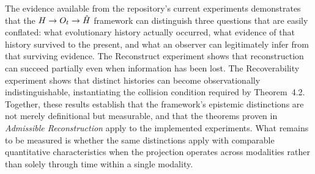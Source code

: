 The evidence available from the repository's current experiments demonstrates that the $H \to O_t \to \hat{H}$ framework can distinguish three questions that are easily conflated: what evolutionary history actually occurred, what evidence of that history survived to the present, and what an observer can legitimately infer from that surviving evidence. The Reconstruct experiment shows that reconstruction can succeed partially even when information has been lost. The Recoverability experiment shows that distinct histories can become observationally indistinguishable, instantiating the collision condition required by Theorem~4.2. Together, these results establish that the framework's epistemic distinctions are not merely definitional but measurable, and that the theorems proven in \emph{Admissible Reconstruction} apply to the implemented experiments. What remains to be measured is whether the same distinctions apply with comparable quantitative characteristics when the projection operates across modalities rather than solely through time within a single modality.
